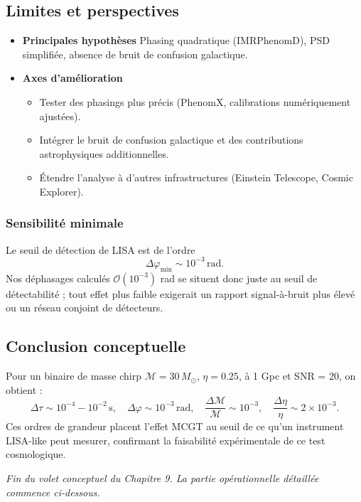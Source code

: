 \subsection{Limites et perspectives}
\begin{itemize}
  \item \textbf{Principales hypothèses}  
    Phasing quadratique (IMRPhenomD), PSD simplifiée, absence de bruit de confusion galactique.
  \item \textbf{Axes d’amélioration}  
    \begin{itemize}
      \item Tester des phasings plus précis (PhenomX, calibrations numériquement ajustées).  
      \item Intégrer le bruit de confusion galactique et des contributions astrophysiques additionnelles.  
      \item Étendre l’analyse à d’autres infrastructures (Einstein Telescope, Cosmic Explorer).
    \end{itemize}
\end{itemize}

\subsubsection*{Sensibilité minimale}
Le seuil de détection de LISA est de l’ordre  
\[
  \Delta\varphi_{\min}\sim10^{-3}\,\mathrm{rad}.
\]
Nos déphasages calculés \(\mathcal{O}(10^{-3})\) rad se situent donc juste au seuil de détectabilité ;  
tout effet plus faible exigerait un rapport signal-à-bruit plus élevé ou un réseau conjoint de détecteurs.

\subsection{Conclusion conceptuelle}
Pour un binaire de masse chirp \(\mathcal{M}=30\,M_{\odot}\), \(\eta=0.25\), à 1 Gpc et SNR = 20, on obtient :
\[
  \Delta\tau \sim 10^{-4}\!-\!10^{-2}\,\mathrm{s}, 
  \quad
  \Delta\varphi \sim 10^{-3}\,\mathrm{rad},
  \quad
  \frac{\Delta\mathcal{M}}{\mathcal{M}} \sim 10^{-3},
  \quad
  \frac{\Delta\eta}{\eta} \sim 2\times10^{-3}.
\]
Ces ordres de grandeur placent l’effet MCGT au seuil de ce qu’un instrument LISA-like peut mesurer, confirmant la faisabilité expérimentale de ce test cosmologique.

\noindent\emph{Fin du volet conceptuel du Chapitre 9. La partie opérationnelle détaillée commence ci-dessous.}